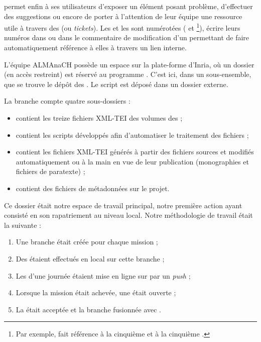 \gitlab{} permet enfin à ses utilisateurs d'exposer un élément posant problème, d'effectuer des suggestions ou encore de porter à l'attention de leur équipe une ressource utile à travers des \issues{} (ou \textit{tickets}). Les \issues{} et les \mergerequests{} sont numérotées ( et \footnote{Par exemple,  fait référence à la cinquième \issue{} et  à la cinquième \mergerequest{}.}), écrire leurs numéros dans \gitlab{} ou dans le commentaire de modification d'un \commit{} permettant de faire automatiquement référence à elles à travers un lien interne.

L'équipe ALMAnaCH possède un espace sur la plate-forme \gitlab{} d'Inria, où un dossier (en accès restreint) est réservé au programme \timeus{}. C'est ici, dans un sous-ensemble, que se trouve le dépôt des \odm. Le script \lse{} est déposé dans un dossier externe.

La branche \master{} compte quatre sous-dossiers :

\begin{itemize}
    \item {} contient les treize fichiers XML-TEI des volumes des \odm{} ;
    \item {} contient les scripts développés afin d'automatiser le traitement des fichiers ;
    \item {} contient les fichiers XML-TEI générés à partir des fichiers sources et modifiés automatiquement ou à la main en vue de leur publication (monographies et fichiers de paratexte) ;
    \item {} contient des fichiers de métadonnées sur le projet.
\end{itemize}

Ce dossier était notre espace de travail principal, notre première action ayant consisté en son rapatriement au niveau local. Notre méthodologie de travail était la suivante :

\begin{enumerate}
    \item Une branche était créée pour chaque mission ;
    \item Des \commits{} étaient effectués en local sur cette branche ;
    \item Les \commits{} d'une journée étaient mise en ligne sur \gitlab{} par un \textit{push} ;
    \item Lorsque la mission était achevée, une \mergerequest{} était ouverte ;
    \item La \mergerequest{} était acceptée et la branche fusionnée avec \master.
\end{enumerate}

